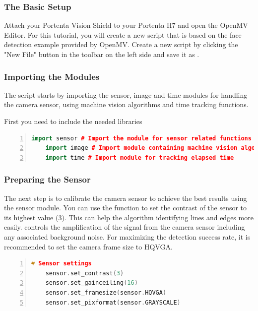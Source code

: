 \subsubsection{The Basic Setup} Attach your Portenta Vision Shield to your Portenta H7 and open the OpenMV Editor. For this tutorial, you will create a new script that is based on the face detection example provided by OpenMV. Create a new script by clicking the "New File" button in the toolbar on the left side and save it as . \cite{portentaFaceFilter:2024}

\subsubsection{Importing the Modules} The script starts by importing the sensor, image and time modules for handling the camera sensor, using machine vision algorithms and time tracking functions.  

First you need to include the needed libraries \cite{portentaFaceFilter:2024}

\begin{lstlisting}[language=C++, frame=single, numbers=left, basicstyle=\ttfamily\small]
	import sensor # Import the module for sensor related functions
	import image # Import module containing machine vision algorithms
	import time # Import module for tracking elapsed time
\end{lstlisting}

\subsubsection{Preparing the Sensor} The next step is to calibrate the camera sensor to achieve the best results using the sensor module. You can use the  function to set the contrast of the sensor to its highest value (3). This can help the algorithm identifying lines and edges more easily.  controls the amplification of the signal from the camera sensor including any associated background noise. For maximizing the detection success rate, it is recommended to set the camera frame size to HQVGA. \cite{portentaFaceFilter:2024}

\begin{lstlisting}[language=C++, frame=single, numbers=left, basicstyle=\ttfamily\small]
	# Sensor settings
	sensor.set_contrast(3)
	sensor.set_gainceiling(16)
	sensor.set_framesize(sensor.HQVGA)
	sensor.set_pixformat(sensor.GRAYSCALE)
\end{lstlisting}

